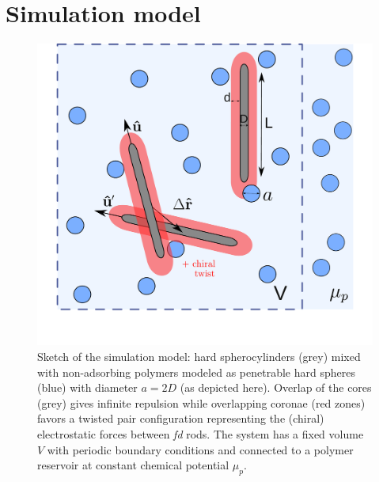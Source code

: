 


\section{Simulation model}

\begin{figure}
	\includegraphics[width = 0.6\columnwidth]{figures/chapter-5/spheromans}
	\caption[Sketch of the simulation model]{ Sketch of the simulation model: hard spherocylinders (grey) mixed with non-adsorbing polymers modeled as penetrable hard spheres (blue) with diameter $a = 2D$ (as depicted here). Overlap of the cores (grey) gives infinite repulsion while overlapping coronae (red zones) favors a twisted pair configuration representing the (chiral) electrostatic forces between {\em fd} rods. The system has a fixed volume $V$ with periodic boundary conditions and connected to a polymer reservoir at constant chemical potential $\mu_p$. }
	\label{sketch}
\end{figure}


